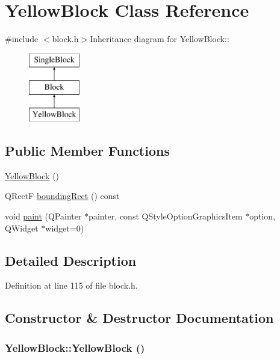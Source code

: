 \hypertarget{class_yellow_block}{
\section{YellowBlock Class Reference}
\label{class_yellow_block}
}


{\ttfamily \#include $<$block.h$>$}Inheritance diagram for YellowBlock::\begin{figure}[H]
\begin{center}
\leavevmode
\includegraphics[height=3cm]{class_yellow_block}
\end{center}
\end{figure}
\subsection*{Public Member Functions}
\begin{DoxyCompactItemize}
\item 
\hyperlink{class_yellow_block_aa3f2f6edd668e62cdc6c97255e9854e7}{YellowBlock} ()
\item 
QRectF \hyperlink{class_yellow_block_a05f341c5d1b859d8c7b909a5cfee7601}{boundingRect} () const 
\item 
void \hyperlink{class_yellow_block_a37c29857cc065cab86a81bcfdd6c3f63}{paint} (QPainter $\ast$painter, const QStyleOptionGraphicsItem $\ast$option, QWidget $\ast$widget=0)
\end{DoxyCompactItemize}


\subsection{Detailed Description}


Definition at line 115 of file block.h.

\subsection{Constructor \& Destructor Documentation}
\hypertarget{class_yellow_block_aa3f2f6edd668e62cdc6c97255e9854e7}{
\subsubsection[{YellowBlock}]{\setlength{\rightskip}{0pt plus 5cm}YellowBlock::YellowBlock ()}}
\label{class_yellow_block_aa3f2f6edd668e62cdc6c97255e9854e7}


